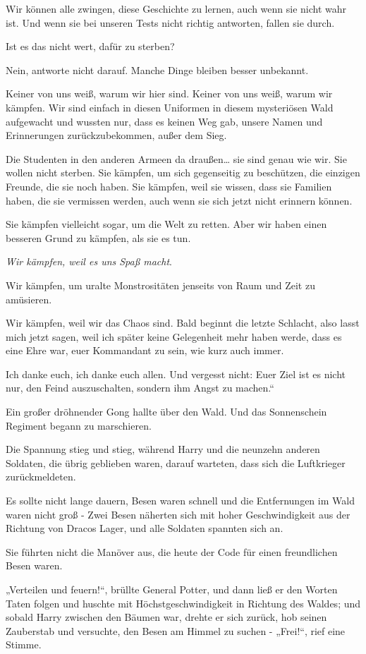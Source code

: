 {Wir können alle zwingen, diese Geschichte zu lernen, auch wenn sie nicht wahr ist. Und wenn sie bei unseren Tests nicht richtig antworten, fallen sie durch.

Ist es das nicht wert, dafür zu sterben?

Nein, antworte nicht darauf. Manche Dinge bleiben besser unbekannt.

Keiner von uns weiß, warum wir hier sind. Keiner von uns weiß, warum wir kämpfen. Wir sind einfach in diesen Uniformen in diesem mysteriösen Wald aufgewacht und wussten nur, dass es keinen Weg gab, unsere Namen und Erinnerungen zurückzubekommen, außer dem Sieg.

Die Studenten in den anderen Armeen da draußen… sie sind genau wie wir. Sie wollen nicht sterben. Sie kämpfen, um sich gegenseitig zu beschützen, die einzigen Freunde, die sie noch haben. Sie kämpfen, weil sie wissen, dass sie Familien haben, die sie vermissen werden, auch wenn sie sich jetzt nicht erinnern können.

Sie kämpfen vielleicht sogar, um die Welt zu retten. Aber wir haben einen besseren Grund zu kämpfen, als sie es tun.

\emph{Wir kämpfen, weil es uns Spaß macht}.

Wir kämpfen, um uralte Monstrositäten jenseits von Raum und Zeit zu amüsieren.

Wir kämpfen, weil wir das Chaos sind. Bald beginnt die letzte Schlacht, also lasst mich jetzt sagen, weil ich später keine Gelegenheit mehr haben werde, dass es eine Ehre war, euer Kommandant zu sein, wie kurz auch immer.

Ich danke euch, ich danke euch allen. Und vergesst nicht: Euer Ziel ist es nicht nur, den Feind auszuschalten, sondern ihm Angst zu machen.“

Ein großer dröhnender Gong hallte über den Wald. Und das Sonnenschein Regiment begann zu marschieren.

Die Spannung stieg und stieg, während Harry und die neunzehn anderen Soldaten, die übrig geblieben waren, darauf warteten, dass sich die Luftkrieger zurückmeldeten.

Es sollte nicht lange dauern, Besen waren schnell und die Entfernungen im Wald waren nicht groß - Zwei Besen näherten sich mit hoher Geschwindigkeit aus der Richtung von Dracos Lager, und alle Soldaten spannten sich an.

Sie führten nicht die Manöver aus, die heute der Code für einen freundlichen Besen waren.

„Verteilen und feuern!“, brüllte General Potter, und dann ließ er den Worten Taten folgen und huschte mit Höchstgeschwindigkeit in Richtung des Waldes; und sobald Harry zwischen den Bäumen war, drehte er sich zurück, hob seinen Zauberstab und versuchte, den Besen am Himmel zu suchen - „Frei!“, rief eine Stimme.

}
